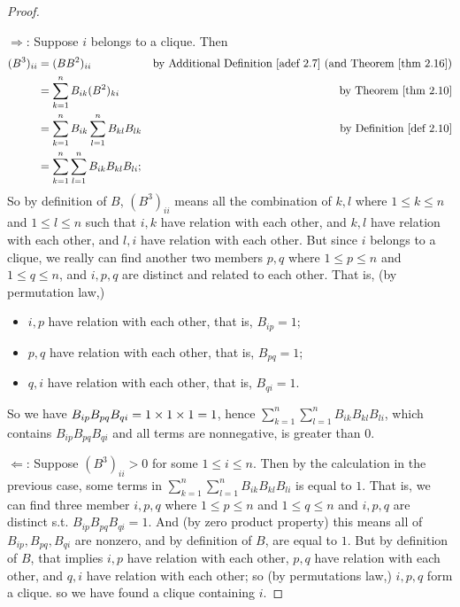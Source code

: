 \begin{proof} \ 

\(\Longrightarrow\): Suppose \(i\) belongs to a clique.
Then
\begin{align*}
    (B^3)_{ii} & = (BB^2)_{ii} & \text{by \ADEF{2.7} (and \THM{2.16})}\\
               & = \sum_{k = 1}^n B_{ik} (B^2)_{ki} & \text{by \THM{2.10}} \\
               & = \sum_{k = 1}^n B_{ik} \sum_{l = 1}^n B_{kl} B_{lk} & \text{by \DEF{2.10}} \\
               & = \sum_{k = 1}^n \sum_{l = 1}^n B_{ik} B_{kl} B_{li};
\end{align*}
So by definition of \(B\), \((B^3)_{ii}\) means all the combination of \(k, l\) where \(1 \le k \le n\) and \(1 \le l \le n\) such that \(i, k\) have relation with each other, and \(k, l\) have relation with each other, and \(l, i\) have relation with each other.
But since \(i\) belongs to a clique, we really can find another two members \(p, q\) where \(1 \le p \le n\) and \(1 \le q \le n\), and \(i, p, q\) are distinct and related to each other.
That is, (by permutation law,)
\begin{itemize}
    \item \(i, p\) have relation with each other, that is, \(B_{ip} = 1\);
    \item \(p, q\) have relation with each other, that is, \(B_{pq} = 1\);
    \item \(q, i\) have relation with each other, that is, \(B_{qi} = 1\).
\end{itemize}
So we have \(B_{ip} B_{pq} B_{qi} = 1 \times 1 \times 1 = 1\), hence \(\sum_{k = 1}^n \sum_{l = 1}^n B_{ik} B_{kl} B_{li}\), which contains \(B_{ip} B_{pq} B_{qi}\) and all terms are nonnegative, is greater than \(0\).

\(\Longleftarrow\): Suppose \((B^3)_{ii} > 0\) for some \(1 \le i \le n\).
Then by the calculation in the previous case, some terms in \(\sum_{k = 1}^n \sum_{l = 1}^n B_{ik} B_{kl} B_{li}\) is equal to \(1\).
That is, we can find three member \(i, p, q\) where \(1 \le p \le n\) and \(1 \le q \le n\) and \(i, p, q\) are distinct s.t. \(B_{ip} B_{pq} B_{qi} = 1\).
And (by zero product property) this means all of \(B_{ip}, B_{pq}, B_{qi}\) are nonzero, and by definition of \(B\), are equal to \(1\).
But by definition of \(B\), that implies \(i, p\) have relation with each other, \(p, q\) have relation with each other, and \(q, i\) have relation with each other;
so (by permutations law,) \(i, p, q\) form a clique.
so we have found a clique containing \(i\).
\end{proof}

